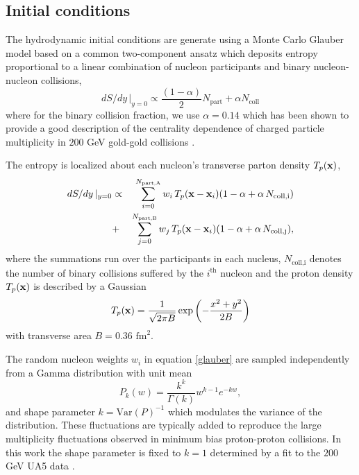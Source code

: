 \documentclass[aps,prc,reprint,amsmath,nofootinbib,superscriptaddress]{revtex4-1}
\begin{document}
\subsection{Initial conditions}
\label{initial_condition}

The hydrodynamic initial conditions are generate using a Monte Carlo Glauber model based on a common two-component ansatz which deposits entropy proportional to a linear combination 
of nucleon participants and binary nucleon-nucleon collisions,
\begin{equation}
 dS/dy \,\vert_{y=0} \propto \frac{(1-\alpha)}{2}N_\text{part} + \alpha N_\text{coll}
 \label{twocomponent}
\end{equation}
where for the binary collision fraction, we use $\alpha=0.14$ which has been shown to provide a good description of the centrality dependence of charged particle 
multiplicity in $200$ GeV gold-gold collisions \cite{?}.

The entropy is localized about each nucleon's transverse parton density $T_p({\bf x})$,
\begin{eqnarray}
 dS/dy \,\vert_{y=0} &\propto& \sum\limits_{i=0}^{N_\text{part,A}} w_i\, T_p({\bf x} - {\bf x}_i)(1-\alpha + \alpha\, N_\text{coll,i}) \nonumber \\
                     &+& \sum\limits_{j=0}^{N_\text{part,B}} w_j\, T_p({\bf x} - {\bf x}_i)(1-\alpha + \alpha\, N_\text{coll,j}),
 \label{glauber}
\end{eqnarray}
where the summations run over the participants in each nucleus, $N_\text{coll,i}$ denotes the number of binary collisions suffered by the $i^\text{th}$ nucleon 
and the proton density $T_p({\bf x})$ is described by a Gaussian
\begin{equation}
 T_p({\bf x}) = \frac{1}{\sqrt{2 \pi B}} \exp \left(-\frac{x^2+y^2}{2 B} \right)
\end{equation}
with transverse area $B = 0.36$ $\text{fm}^2$.

The random nucleon weights $w_i$ in equation \eqref{glauber} are sampled independently from a Gamma distribution with unit mean
\begin{equation}
 P_k(w) = \frac{k^k}{\Gamma(k)} w^{k-1} e^{-k w},
\end{equation}
and shape parameter $k = \text{Var}(P)^{-1}$ which modulates the variance of the distribution. 
These fluctuations are typically added \cite{?} to reproduce the large multiplicity fluctuations observed in minimum bias proton-proton collisions. 
In this work the shape parameter is fixed to $k=1$ determined by a fit to the $200$ GeV UA5 data \cite{?}. 
\end{document}
